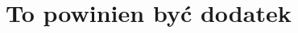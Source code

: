 \documentclass[inzynier,druk]{dyplom}
\begin{document}















\appendixpage
\appendix

\chapter{To powinien być dodatek}\label{Dod1}





\end{document}
